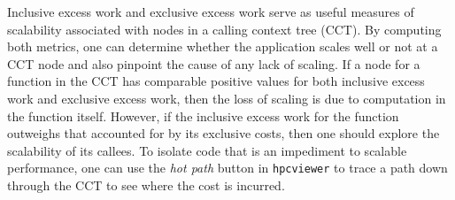 \documentclass[12pt]{article}
\begin{document}
Inclusive excess work and exclusive excess work serve as useful measures
of scalability associated with nodes in a calling context tree (CCT).
By computing both metrics, one can determine whether the application
scales well or not at a CCT node and also pinpoint the cause of any lack
of scaling. If a node for a function in the CCT has comparable positive
values for both inclusive excess work and exclusive excess work, then the
loss of scaling is due to computation in the function itself.  However,
if the inclusive excess work for the function outweighs that accounted
for by its exclusive costs, then one should explore the scalability
of its callees.  To isolate code that is an impediment to scalable
performance, one can use the {\em hot path} button in {\tt hpcviewer}
to trace a path down through the CCT to see where the cost is incurred.


\clearpage


\vspace{-18pt}

\end{document}
